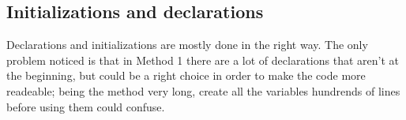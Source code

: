 \subsection{Initializations and declarations}

Declarations and initializations are mostly done in the right way. The only problem noticed is that in Method 1 there are a lot of declarations that aren't at the beginning, 
but could be a right choice in order to make the code more readeable; being the method very long, create all the variables hundrends of lines before using them could confuse.